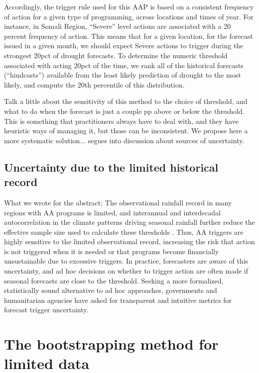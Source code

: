 \documentclass{ametsocV5}
\begin{document}
Accordingly, the trigger rule used for this AAP is based on a consistent frequency of action for a given type of programming, across locations and times of year. For instance, in Somali Region, “Severe” level actions are associated with a 20 percent frequency of action. This means that for a given location, for the forecast issued in a given month, we should expect Severe actions to trigger during the strongest 20pct of drought forecasts. To determine the numeric threshold associated with acting 20pct of the time, we rank all of the historical forecasts (“hindcasts”) available from the least likely prediction of drought to the most likely, and compute the 20th percentile of this distribution.

Talk a little about the sensitivity of this method to the choice of threshold, and what to do when the forecast is just a couple pp above or below the threshold. This is something that practitioners always have to deal with, and they have heuristic ways of managing it, but those can be inconsistent. We propose here a more systematic solution... segues into discussion about sources of uncertainty.

\subsection{Uncertainty due to the limited historical record}

What we wrote for the abstract: The observational rainfall record in many regions with AA programs is limited, and interannual and interdecadal autocorrelation in the climate patterns driving seasonal rainfall further reduce the effective sample size used to calculate these thresholds \citep{martinez_seasonal_2022}. Thus, AA triggers are highly sensitive to the limited observational record, increasing the risk that action is not triggered when it is needed or that programs become financially unsustainable due to excessive triggers. In practice, forecasters are aware of this uncertainty, and ad hoc decisions on whether to trigger action are often made if seasonal forecasts are close to the threshold. Seeking a more formalized, statistically sound alternative to ad hoc approaches, governments and humanitarian agencies have asked for transparent and intuitive metrics for forecast trigger uncertainty.

\section{The bootstrapping method for limited data}
\end{document}
